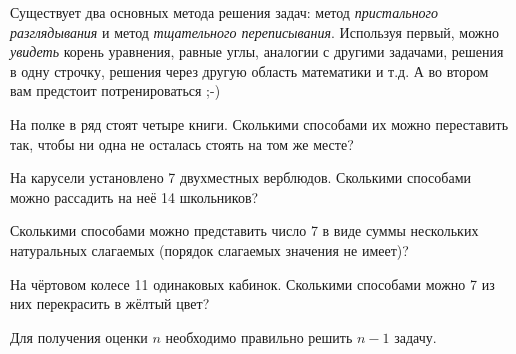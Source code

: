 \documentclass[a4paper,12pt]{article}
\begin{document}
\vspace*{-17mm}

{\footnotesize
Существует два основных метода решения задач: метод \emph{пристального разглядывания} и метод \emph{тщательного переписывания}.
Используя первый, можно \emph{увидеть} корень уравнения, равные углы, аналогии с другими задачами, решения в одну строчку, решения через другую область математики и т.д.
А во втором вам предстоит потренироваться ;-)
\par}

На полке в ряд стоят четыре книги. Сколькими способами их можно переставить так, чтобы ни одна не осталась стоять на том же месте?

На карусели установлено 7 двухместных верблюдов. Сколькими способами можно рассадить на неё 14 школьников?

Сколькими способами можно представить число 7 в виде суммы нескольких натуральных слагаемых (порядок слагаемых значения не имеет)?

На чёртовом колесе 11 одинаковых кабинок. 
Сколькими способами можно 7 из них перекрасить в жёлтый цвет?


\hrl
{\small Для получения оценки $n$ необходимо правильно решить $n-1$ задачу.}

\bigskip
\noindent%
%
\newpage
\vspace*{-\topmargin}\vspace*{-22mm}%
\noindent%
%
\end{document}
